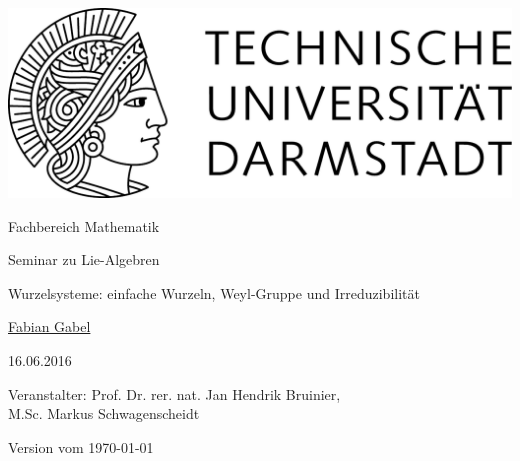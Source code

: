 \begin{titlepage}
  \begin{center}
    \vspace{1cm}
    \includegraphics[width=0.5\linewidth]{TU_Darmstadt_Logo.pdf}
    \vspace{12pt}
    
    \large{Fachbereich Mathematik}
    \vspace{2cm}
    
    \large{Seminar zu Lie-Algebren}
    \vspace{2cm}

    \huge{Wurzelsysteme: einfache Wurzeln, Weyl-Gruppe und Irreduzibilität}
    
    \vspace*{2cm}    
    
		\large
                \href{mailto:gabel@mathematik.tu-darmstadt.de}{Fabian Gabel}
    \vspace*{.5cm}

    16.06.2016 \\
    \vspace*{1cm}

    Veranstalter: Prof. Dr. rer. nat. Jan Hendrik Bruinier,  \\
    \hspace{1.3cm}M.Sc. Markus Schwagenscheidt

    \vspace*{.5cm}

    \tiny{Version vom \today}
  \end{center}
\end{titlepage}
\vspace*{\fill}
